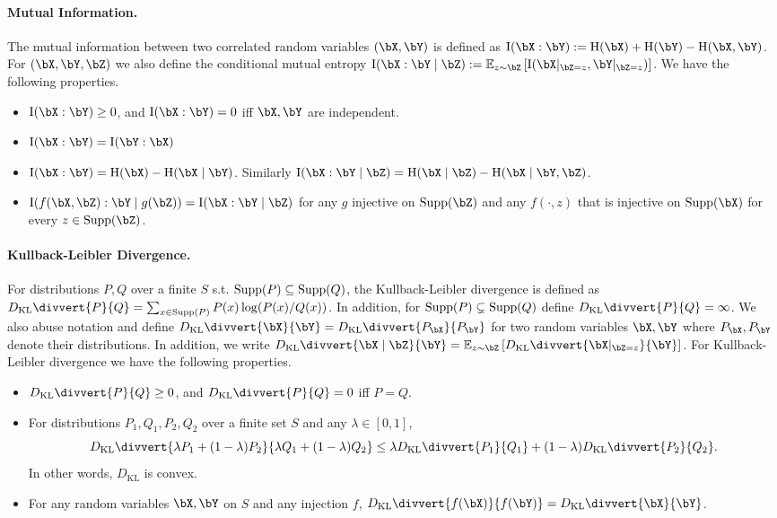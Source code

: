 \documentclass{article}
\newcommand{\KL}{D_{\mathrm{KL}}\divvert}
\DeclarePairedDelimiter{\paren}{(}{)}
\newcommand{\ent}{\mathrm{H}\paren}
\newcommand{\info}{\mathrm{I}\paren}
\begin{document}
\paragraph{Mutual Information.} The mutual information between two correlated random variables $(\bX,\bY)$ is defined as $\info{\bX:\bY}:=\ent{\bX}+\ent{\bY}-\ent{\bX,\bY}$. For $(\bX,\bY,\bZ)$ we also define the conditional mutual entropy $\info{\bX:\bY\mid\bZ}:=\ex[z\sim\bZ]{\info{\bX|_{\bZ=z},\bY|_{\bZ=z}}}$. We have the following properties.
\begin{itemize}
\item 
$\info{\bX:\bY}\ge 0$, and $\info{\bX:\bY}=0$ iff $\bX,\bY$ are independent.
\item 
$\info{\bX:\bY}=\info{\bY:\bX}$
\item 
$\info{\bX:\bY}=\ent{\bX}-\ent{\bX\mid\bY}$. Similarly $\info{\bX:\bY\mid\bZ}=\ent{\bX\mid\bZ}-\ent{\bX\mid\bY,\bZ}$.
\item 
$\info{f(\bX,\bZ):\bY\mid g(\bZ)}=\info{\bX:\bY\mid\bZ}$ for any $g$ injective on $\Supp(\bZ)$ and any $f(\cdot,z)$ that is injective on $\Supp(\bX)$ for every $z\in\Supp(\bZ)$. 
\end{itemize}

\paragraph{Kullback-Leibler Divergence.} For distributions $P,Q$ over a finite $S$ s.t. $\operatorname{Supp}(P)\subseteq \operatorname{Supp}(Q)$, the Kullback-Leibler divergence is defined as $\KL{P}{Q}=\sum_{x\in \Supp(P)}P(x)\log(P(x)/Q(x))$. In addition, for $\operatorname{Supp}(P)\subsetneq \operatorname{Supp}(Q)$ define $\KL{P}{Q}=\infty$. We also abuse notation and define $\KL{\bX}{\bY}=\KL{P_\bX}{P_\bY}$ for two random variables $\bX,\bY$ where $P_{\bX},P_{\bY}$ denote their distributions. In addition, we write $\KL{\bX\mid\bZ}{\bY}=\ex[z\sim\bZ]{\KL{\bX|_{\bZ=z}}{\bY}}$. For Kullback-Leibler divergence we have the following properties. 
\begin{itemize}
\item 
$\KL{P}{Q}\ge 0$, and $\KL{P}{Q}=0$ iff $P=Q$.
\item 
For distributions $P_1,Q_1,P_2,Q_2$ over a finite set $S$ and any $\lambda\in[0,1]$, 
$$\KL{\lambda P_1+(1-\lambda)P_2}{\lambda Q_1 + (1-\lambda) Q_2} \le \lambda \KL{P_1}{Q_1} + (1-\lambda)\KL{P_2}{Q_2}.$$
In other words, $D_\mathrm{KL}$ is convex.
\item 
For any random variables $\bX,\bY$ on $S$ and any injection $f$, $\KL{f(\bX)}{f(\bY)}=\KL{\bX}{\bY}$.
\end{itemize}



\end{document}
